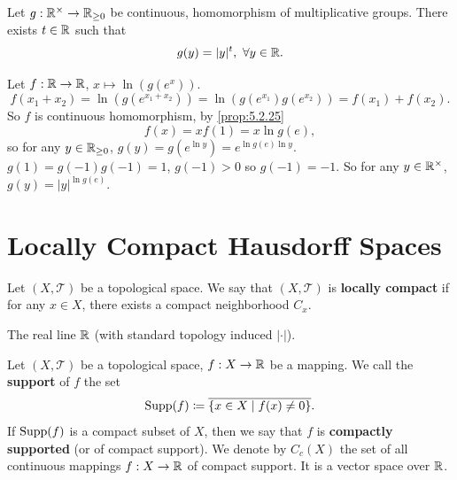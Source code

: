 \begin{corollaryenv}\label{cor:5.2.26}
    Let $g : \mathbb{R}^\times \rightarrow \mathbb{R}_{\ge 0}$ be continuous, homomorphism of multiplicative groups.
    There exists $t \in \mathbb{R}$ such that
    $$g(y) = |y|^t,\ \forall y \in \mathbb{R}.$$
\end{corollaryenv}
\begin{proofenv}
    Let $f : \mathbb{R} \rightarrow \mathbb{R}$, $x \mapsto \ln\left(g(e^x)\right)$.
    $$ f(x_1 + x_2) = \ln(g(e^{x_1 + x_2})) = \ln (g(e^{x_1})g(e^{x_2})) = f(x_1) + f(x_2).$$
    So $f$ is continuous homomorphism, by \ref{prop:5.2.25}
    $$f(x) = x f(1) = x \ln g(e),$$
    so for any $y \in \mathbb{R}_{\ge 0}$, $g(y) = g(e^{\ln y}) = e^{\ln g(e) \ln y}.$
    $g(1) = g(-1) g(-1) = 1$, $g(-1) > 0$ so $g(-1) = -1$.
    So for any $y \in \mathbb{R}^\times$, $g(y) = |y|^{\ln g(e)}$.
\end{proofenv}


\section{Locally Compact Hausdorff Spaces}

\begin{definitionenv}
    Let $(X,\mathscr{T})$ be a topological space.
    We say that $(X,\mathscr{T})$ is \textbf{locally compact} if for any $x \in X$,
    there exists a compact neighborhood $C_x$.
\end{definitionenv}

\begin{exampleenv}
    The real line $\mathbb{R}$ (with standard topology induced $|\cdot|$).
\end{exampleenv}

\begin{definitionenv}
    Let $(X,\mathscr{T})$ be a topological space,
    $f : X \rightarrow \mathbb{R}$ be a mapping.
    We call the \textbf{support} of $f$ the set
    $$\operatorname{\mathrm{Supp}}(f) \coloneq \overline{\{x \in X \mid f(x) \neq 0\}}.$$
    If $\operatorname{\mathrm{Supp}}(f)$ is a compact subset of $X$, then we say that $f$ is \textbf{compactly supported} (or of compact support).
    We denote by $C_c(X)$ the set of all continuous mappings $f : X \rightarrow \mathbb{R}$ of compact support.
    It is a vector space over $\mathbb{R}$.
\end{definitionenv}


